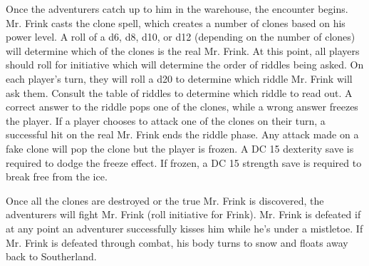 \documentclass{article}
\begin{document}
\begin{multicols*}{2}
	Once the adventurers catch up to him in the warehouse, the encounter begins. Mr. Frink casts the clone spell, which creates a number of clones based on his power level. A roll of a d6, d8, d10, or d12 (depending on the number of clones) will determine which of the clones is the real Mr. Frink. At this point, all players should roll for initiative which will determine the order of riddles being asked. On each player's turn, they will roll a d20 to determine which riddle Mr. Frink will ask them. Consult the table of riddles to determine which riddle to read out. A correct answer to the riddle pops one of the clones, while a wrong answer freezes the player. If a player chooses to attack one of the clones on their turn, a successful hit on the real Mr. Frink ends the riddle phase. Any attack made on a fake clone will pop the clone but the player is frozen. A DC 15 dexterity save is required to dodge the freeze effect. If frozen, a DC 15 strength save is required to break free from the ice.
	
	Once all the clones are destroyed or the true Mr. Frink is discovered, the adventurers will fight Mr. Frink (roll initiative for Frink). Mr. Frink is defeated if at any point an adventurer successfully kisses him while he's under a mistletoe. If Mr. Frink is defeated through combat, his body turns to snow and floats away back to Southerland.

\end{multicols*}
\end{document}

